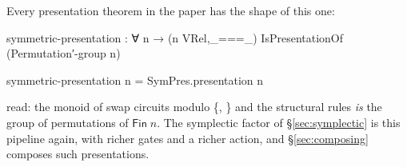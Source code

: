 \noindent Every presentation theorem in the paper has the shape of this
one:

\begin{code}
symmetric-presentation : ∀ n → (n VRel,_===_) IsPresentationOf (Permutation′-group n)
\end{code}
\begin{code}[hide]
symmetric-presentation n = SymPres.presentation {n}
\end{code}

\noindent read: the monoid of swap circuits modulo \{,
\} and the structural rules \emph{is} the group of
permutations of $\mathsf{Fin}\;n$.  The symplectic
factor of \S\ref{sec:symplectic} is this pipeline again, with richer
gates and a richer action, and \S\ref{sec:composing} composes such
presentations.
